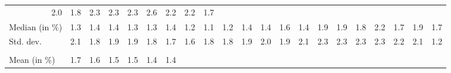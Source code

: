 \begin{tabular}{lllllllllllllllllllll}
  \multicolumn{1}{r}{2.0} &
  \multicolumn{1}{r}{1.8} &
  \multicolumn{1}{r}{2.3} &
  \multicolumn{1}{r}{2.3} &
  \multicolumn{1}{r}{2.3} &
  \multicolumn{1}{r}{2.6} &
  \multicolumn{1}{r}{2.2} &
  \multicolumn{1}{r}{2.2} &
  \multicolumn{1}{r}{1.7} \\
\multicolumn{1}{l}{\hspace{2em}Median (in $\%$)} &
  \multicolumn{1}{|r}{1.3} &
  \multicolumn{1}{r}{1.4} &
  \multicolumn{1}{r}{1.4} &
  \multicolumn{1}{r}{1.3} &
  \multicolumn{1}{r}{1.3} &
  \multicolumn{1}{r}{1.4} &
  \multicolumn{1}{r}{1.2} &
  \multicolumn{1}{r}{1.1} &
  \multicolumn{1}{r}{1.2} &
  \multicolumn{1}{r}{1.4} &
  \multicolumn{1}{r}{1.4} &
  \multicolumn{1}{r}{1.6} &
  \multicolumn{1}{r}{1.4} &
  \multicolumn{1}{r}{1.9} &
  \multicolumn{1}{r}{1.9} &
  \multicolumn{1}{r}{1.8} &
  \multicolumn{1}{r}{2.2} &
  \multicolumn{1}{r}{1.7} &
  \multicolumn{1}{r}{1.9} &
  \multicolumn{1}{r}{1.7} \\
\multicolumn{1}{l}{\hspace{2em}Std. dev.} &
  \multicolumn{1}{|r}{2.1} &
  \multicolumn{1}{r}{1.8} &
  \multicolumn{1}{r}{1.9} &
  \multicolumn{1}{r}{1.9} &
  \multicolumn{1}{r}{1.8} &
  \multicolumn{1}{r}{1.7} &
  \multicolumn{1}{r}{1.6} &
  \multicolumn{1}{r}{1.8} &
  \multicolumn{1}{r}{1.8} &
  \multicolumn{1}{r}{1.9} &
  \multicolumn{1}{r}{2.0} &
  \multicolumn{1}{r}{1.9} &
  \multicolumn{1}{r}{2.1} &
  \multicolumn{1}{r}{2.3} &
  \multicolumn{1}{r}{2.3} &
  \multicolumn{1}{r}{2.3} &
  \multicolumn{1}{r}{2.3} &
  \multicolumn{1}{r}{2.2} &
  \multicolumn{1}{r}{2.1} &
  \multicolumn{1}{r}{1.2} \\
\multicolumn{1}{l}{\hspace{1em}{\textit{Additive term} ($\widehat{t}/\widetilde{p}$)}} &
  \multicolumn{1}{|r}{} &
  \multicolumn{1}{r}{} &
  \multicolumn{1}{r}{} &
  \multicolumn{1}{r}{} &
  \multicolumn{1}{r}{} &
  \multicolumn{1}{r}{} &
  \multicolumn{1}{r}{} &
  \multicolumn{1}{r}{} &
  \multicolumn{1}{r}{} &
  \multicolumn{1}{r}{} &
  \multicolumn{1}{r}{} &
  \multicolumn{1}{r}{} &
  \multicolumn{1}{r}{} &
  \multicolumn{1}{r}{} &
  \multicolumn{1}{r}{} &
  \multicolumn{1}{r}{} &
  \multicolumn{1}{r}{} &
  \multicolumn{1}{r}{} &
  \multicolumn{1}{r}{} &
  \multicolumn{1}{r}{} \\
\multicolumn{1}{l}{\hspace{2em}Mean (in $\%$)} &
  \multicolumn{1}{|r}{1.7} &
  \multicolumn{1}{r}{1.6} &
  \multicolumn{1}{r}{1.5} &
  \multicolumn{1}{r}{1.5} &
  \multicolumn{1}{r}{1.4} &
  \multicolumn{1}{r}{1.4} &

\end{tabular}
